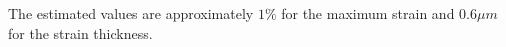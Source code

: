 \documentclass[12pt,oneside,notitlepage,abstracton,a4paper]{scrartcl}
\begin{document}
The estimated values are approximately $1 \%$ for the maximum strain and $0.6 \mu m$ for the strain thickness.\\

% 
% 

\clearpage 



\nocite{*}
 
{}
\end{document}
